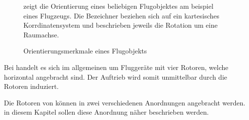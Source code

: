 








\begin{figure}[ht!]
\vspace{0.25cm}
\begin{center}
\caption{Orientierungsmerkmale eines Flugobjekts \cite{parotSDK}}
\label{fig:Orient}
\end{center}

\vspace{0.25cm}
 zeigt die Orientierung eines beliebigen Flugobjektes am beispiel eines Flugzeugs. Die Bezeichner beziehen sich auf ein kartesisches Korrdinatensystem und beschrieben jeweils die Rotation um eine Raumachse.
\end{figure}






Bei \Quad[n] handelt es sich im allgemeinen um Fluggeräte mit vier Rotoren, welche horizontal angebracht sind. Der Auftrieb wird somit unmittelbar durch die Rotoren induziert.

Die Rotoren von \Quad[n] können in zwei verschiedenen Anordnungen angebracht werden. in diesem Kapitel sollen diese Anordnung näher beschrieben werden.


